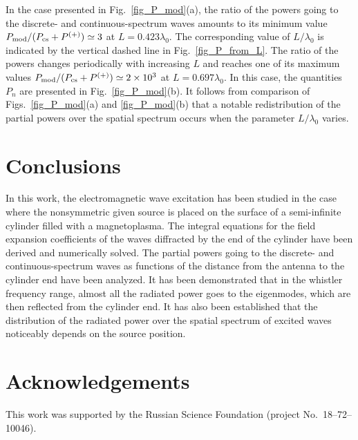 \documentclass[summary]{URSIGASS2020}
\begin{document}
In the case presented in Fig.~\ref{fig_P_mod}(a), the ratio of the powers going to the discrete- and continuous-spectrum waves amounts to its minimum value $ P_{\rm mod}/(P_{\rm cs}+P^{(+)})\simeq3 $ at $ L=0{.}423\lambda_{0} $.
The corresponding value of $ L/\lambda_{0} $ is indicated by the vertical dashed line in Fig.~\ref{fig_P_from_L}.
The ratio of the powers changes periodically with increasing $ L $ and reaches one of its maximum values $ P_{\rm mod}/(P_{\rm cs}+P^{(+)})\simeq2\times10^{3} $ at $ L=0{.}697\lambda_{0} $.
In this case, the quantities $P_n$ are presented in Fig.~\ref{fig_P_mod}(b).
It follows from comparison of Figs.~\ref{fig_P_mod}(a) and \ref{fig_P_mod}(b) that a notable redistribution of the partial powers over the spatial spectrum occurs when the parameter $ L/\lambda_{0} $ varies.

{\enlargethispage{-0.12in}}

\section{Conclusions}
In this work, the electromagnetic wave excitation has been studied in the case where the nonsymmetric given source is placed on the surface of a semi-infinite cylinder filled with a magnetoplasma.
The integral equations for the field expansion coefficients of the waves diffracted by the end of the cylinder have been derived and numerically solved.
The partial powers going to the discrete- and continuous-spectrum waves as functions of the distance from the antenna to the cylinder end have been analyzed. 
It has been demonstrated that in the whistler frequency range, almost all the radiated power goes to the eigenmodes, which are then reflected from the cylinder end.
It has also been established that the distribution of the radiated power over the spatial spectrum of excited waves noticeably depends on the source position.

\section{Acknowledgements}

This work was supported by the Russian Science Foundation (project No.~18--72--10046).
\end{document}
